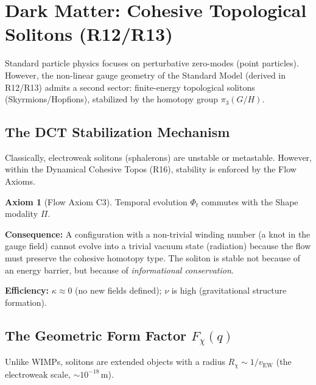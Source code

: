 \documentclass[11pt,a4paper]{article}
\theoremstyle{definition}
\newtheorem{axiom}{Axiom}
\theoremstyle{plain}
\theoremstyle{remark}
\newcommand{\novelty}{\nu}
\newcommand{\effort}{\kappa}
\begin{document}
\section{Dark Matter: Cohesive Topological Solitons (R12/R13)}

Standard particle physics focuses on perturbative zero-modes (point particles). However, the non-linear gauge geometry of the Standard Model (derived in R12/R13) admits a second sector: finite-energy topological solitons (Skyrmions/Hopfions), stabilized by the homotopy group $\pi_3(G/H)$.

\subsection{The DCT Stabilization Mechanism}

Classically, electroweak solitons (sphalerons) are unstable or metastable. However, within the Dynamical Cohesive Topos (R16), stability is enforced by the Flow Axioms.

\begin{axiom}[Flow Axiom C3]
Temporal evolution $\Phi_t$ commutes with the Shape modality $\Pi$.
\end{axiom}

\textbf{Consequence:} A configuration with a non-trivial winding number (a knot in the gauge field) cannot evolve into a trivial vacuum state (radiation) because the flow must preserve the cohesive homotopy type. The soliton is stable not because of an energy barrier, but because of \emph{informational conservation}.

\textbf{Efficiency:} $\effort \approx 0$ (no new fields defined); $\novelty$ is high (gravitational structure formation).

\subsection{The Geometric Form Factor \texorpdfstring{$F_\chi(q)$}{F(q)}}

Unlike WIMPs, solitons are extended objects with a radius $R_\chi \sim 1/v_\mathrm{EW}$ (the electroweak scale, $\sim 10^{-18}$\,m).
\end{document}
